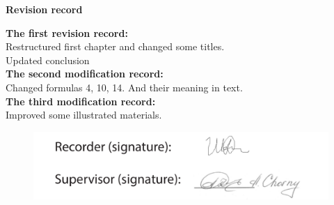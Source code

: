 \begin{center}
	\Large\textbf{Revision record}
\end{center}
\textbf{The first revision record:}\\
Restructured first chapter and changed some titles.\\
Updated conclusion\\
\textbf{The second modification record:}\\
Changed formulas 4, 10, 14. And their meaning in text.\\
\textbf{The third modification record:}\\
Improved some illustrated materials.
\begin{figure}[H]
	\begin{flushright}
		\includegraphics[width=0.55\linewidth]{../Assets/rev}
	\end{flushright}
\end{figure}